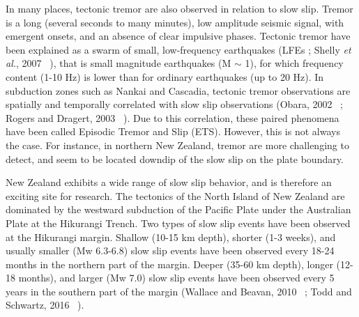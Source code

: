 \documentclass[draft]{agujournal2018}
\begin{document}
In many places, tectonic tremor are also observed in relation to slow slip. Tremor is a long (several seconds to many minutes), low amplitude seismic signal, with emergent onsets, and an absence of clear impulsive phases. Tectonic tremor have been explained as a swarm of small, low-frequency earthquakes (LFEs ; Shelly \textit{et al.}, 2007 ~\cite{SHE_2007_nature}), that is small magnitude earthquakes (M $\sim$ 1), for which frequency content (1-10 Hz) is lower than for ordinary earthquakes (up to 20 Hz). In subduction zones such as Nankai and Cascadia, tectonic tremor observations are spatially and temporally correlated with slow slip observations (Obara, 2002 ~\cite{OBA_2002}; Rogers and Dragert, 2003 ~\cite{ROG_2003}). Due to this correlation, these paired phenomena have been called Episodic Tremor and Slip (ETS). However, this is not always the case. For instance, in northern New Zealand, tremor are more challenging to detect, and seem to be located downdip of the slow slip on the plate boundary.

New Zealand exhibits a wide range of slow slip behavior, and is therefore an exciting site for research. The tectonics of the North Island of New Zealand are dominated by the westward subduction of the Pacific Plate under the Australian Plate at the Hikurangi Trench. Two types of slow slip events have been observed at the Hikurangi margin. Shallow (10-15 km depth), shorter (1-3 weeks), and usually smaller (Mw 6.3-6.8) slow slip events have been observed every 18-24 months in the northern part of the margin. Deeper (35-60 km depth), longer (12-18 months), and larger (Mw 7.0) slow slip events have been observed every 5 years in the southern part of the margin (Wallace and Beavan, 2010 ~\cite{WAL_2010}; Todd and Schwartz, 2016 ~\cite{TOD_2016}).
\end{document}

